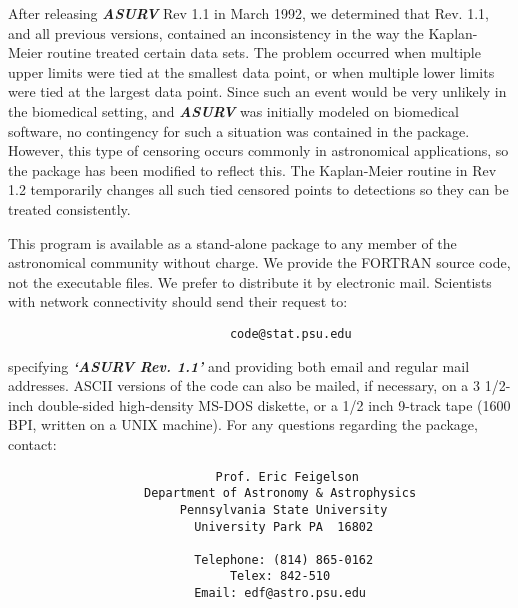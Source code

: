 \bigskip


     After releasing {\sl\bf ASURV} Rev 1.1 in March 1992, we determined that
Rev. 1.1, and all previous versions, contained an inconsistency in the
way the Kaplan-Meier routine treated certain data sets.  The problem occurred 
when multiple upper limits were tied at the smallest data point, or when
multiple lower limits were tied at the largest data point.  Since such an 
event would be very unlikely in the biomedical setting, and {\sl\bf ASURV}
was initially modeled on biomedical software, no contingency for such a
situation was contained in the package.  However, this type of censoring
occurs commonly in astronomical applications, so the package has been 
modified to reflect this.  The Kaplan-Meier routine in Rev 1.2 temporarily 
changes all such tied censored points to detections so they can be 
treated consistently.

\bigskip

 
     This program is available as a stand-alone package  to any member of 
the astronomical community without charge.  We provide the FORTRAN source code,
not the executable files. We prefer to distribute it by electronic mail.  
Scientists with network connectivity should send their request to:

\begin{center}
\begin{verbatim}
                               code@stat.psu.edu
\end{verbatim}
\end{center}

\noindent specifying {\sl\bf `ASURV Rev. 1.1'} and providing both email and 
regular mail addresses.   ASCII versions of the code can also be mailed, if 
necessary,  on a 3 1/2-inch double-sided high-density MS-DOS diskette, or a
1/2 inch 9-track tape (1600 BPI, written on a UNIX machine).  For any 
questions regarding the package, contact:

\begin{center}
\begin{verbatim}
                             Prof. Eric Feigelson 
                   Department of Astronomy & Astrophysics
                        Pennsylvania State University 
                          University Park PA  16802

                          Telephone: (814) 865-0162 
                               Telex: 842-510  
                          Email: edf@astro.psu.edu
\end{verbatim}
\end{center}

